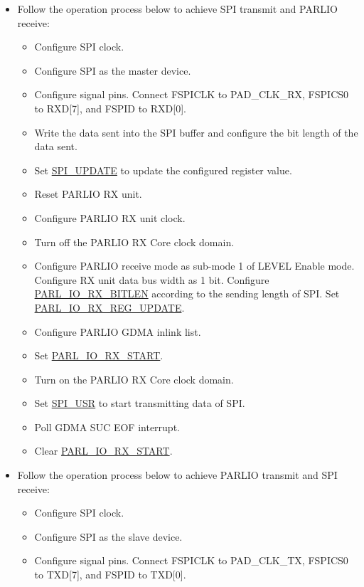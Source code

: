 \documentclass[main\_\_EN.tex]{subfiles}
\begin{document}
\begin{itemize}
    \item Follow the operation process below to achieve SPI transmit and PARLIO receive:
    \begin{itemize}
        \item Configure SPI clock.
        \item Configure SPI as the master device.
        \item Configure signal pins. Connect FSPICLK to PAD\_CLK\_RX, FSPICS0 to RXD[7], and FSPID to RXD[0]. 
        \item Write the data sent into the SPI buffer and configure the bit length of the data sent.
        \item Set \hyperref[fielddesc:SPIUPDATE]{SPI\_UPDATE} to update the configured register value.
        \item Reset PARLIO RX unit.
        \item Configure PARLIO RX unit clock.
        \item Turn off the PARLIO RX Core clock domain.
        \item Configure PARLIO receive mode as sub-mode 1 of LEVEL Enable mode. Configure RX unit data bus width as 1 bit. Configure \hyperref[fielddesc:PARLIORXBITLEN]{PARL\_IO\_RX\_BITLEN} according to the sending length of SPI. Set \hyperref[fielddesc:PARLIORXREGUPDATE]{PARL\_IO\_RX\_REG\_UPDATE}.
        \item Configure PARLIO GDMA inlink list.
        \item Set \hyperref[fielddesc:PARLIORXSTART]{PARL\_IO\_RX\_START}.
        \item Turn on the PARLIO RX Core clock domain.
        \item Set \hyperref[fielddesc:SPIUSR]{SPI\_USR} to start transmitting data of SPI.
        \item Poll GDMA SUC EOF interrupt.
        \item Clear \hyperref[fielddesc:PARLIORXSTART]{PARL\_IO\_RX\_START}.  
    \end{itemize} 
    \item Follow the operation process below to achieve PARLIO transmit and SPI receive:
    \begin{itemize}
        \item Configure SPI clock.
        \item Configure SPI as the slave device.
        \item Configure signal pins. Connect FSPICLK to PAD\_CLK\_TX, FSPICS0 to TXD[7], and FSPID to TXD[0]. 

\end{itemize}
\end{itemize}
\end{document}
